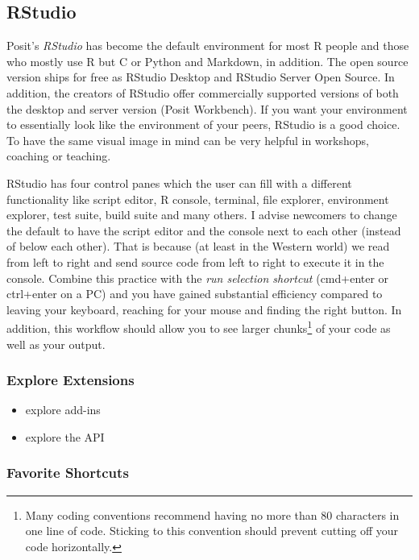 \documentclass[
  12pt,
  letterpaper,
]{krantz}
\begin{document}
\hypertarget{rstudio}{%
\subsection{RStudio}\label{rstudio}}

Posit's \emph{RStudio} has become the default environment for most R
people and those who mostly use R but C or Python and
Markdown, in addition. The open source version ships for free as RStudio
Desktop and RStudio Server Open Source. In addition, the creators of
RStudio offer commercially supported versions of both the desktop and
server version (Posit Workbench). If you want your environment to
essentially look like the environment of your peers, RStudio is a good
choice. To have the same visual image in mind can be very helpful in
workshops, coaching or teaching.

RStudio has four control panes which the user can fill with a different
functionality like script editor, R console, terminal, file explorer,
environment explorer, test suite, build suite and many others. I advise
newcomers to change the default to have the script editor and the
console next to each other (instead of below each other). That is
because (at least in the Western world) we read from left to right and
send source code from left to right to execute it in the console.
Combine this practice with the \emph{run selection shortcut} (cmd+enter
or ctrl+enter on a PC) and you have gained substantial efficiency
compared to leaving your keyboard, reaching for your mouse and finding
the right button. In addition, this workflow should allow you to see
larger chunks\footnote{Many coding conventions recommend having no more
  than 80 characters in one line of code. Sticking to this convention
  should prevent cutting off your code horizontally.} of your code as
well as your output.

\hypertarget{explore-extensions}{%
\subsubsection*{Explore Extensions}\label{explore-extensions}}

\begin{itemize}
\item
  explore add-ins
\item
  explore the API
\end{itemize}

\hypertarget{favorite-shortcuts}{%
\subsubsection*{Favorite Shortcuts}\label{favorite-shortcuts}}
\end{document}
